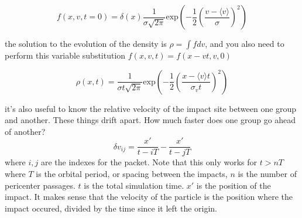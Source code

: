     \begin{equation}
        f(x,v,t=0) = \delta(x)\frac{1}{\sigma\sqrt{2\pi}}\mathrm{exp}\left(-\frac{1}{2}\left(\frac{v-\langle v \rangle}{\sigma}\right)^2\right)
    \end{equation}    

    the solution to the evolution of the density is $\rho = \int f dv$, and you also need to perform this variable substitution $f(x,v,t) = f(x-vt,v,0)$

    \begin{equation}
        \rho(x,t) = \frac{1}{\sigma t \sqrt{2\pi} }\mathrm{exp}\left(-\frac{1}{2}\left(\frac{x-\langle v \rangle t}{\sigma_v t}\right)^2\right)
    \end{equation}

    it's also useful to know the relative velocity of the impact site between one group and another. These things drift apart. How much faster does one group go ahead of another? 
    \begin{equation}
        \delta v_{ij} = \frac{x\prime}{t-iT} - \frac{x\prime}{t-jT}
    \end{equation}
    where $i,j$ are the indexes for the packet. Note that this only works for $t > nT$ where $T$ is the orbital period, or spacing between the impacts, $n$ is the number of pericenter passages. $t$ is the total simulation time. $x\prime$ is the position of the impact. It makes sense that the velocity of the particle is the position where the impact occured, divided by the time since it left the origin. 